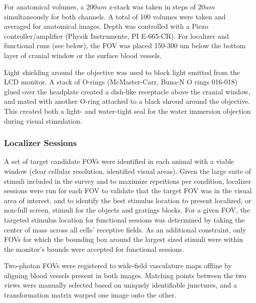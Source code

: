 For anatomical volumes, a 200$um$ z-stack was taken in steps of 20$um$ simultaneously for both channels. A total of 100 volumes were taken and averaged for anatomical images. Depth was controlled with a Piezo controller/amplifier (Physik Instrumente, PI E-665-CR). For localizer and functional runs (see below), the FOV was placed 150-300 um below the bottom layer of cranial window or the surface blood vessels. 

Light shielding around the objective was used to block light emitted from the LCD monitor. A stack of O-rings (McMaster-Carr, Buna-N O rings 016-018) glued over the headplate created a dish-like receptacle above the cranial window\cite{Goldey2014}, and mated with another O-ring attached to a black shroud around the objective. This created both a light- and water-tight seal for the water immersion objection during visual stimulation. 

\subsubsection{Localizer Sessions}
A set of target candidate FOVs were identified in each animal with a viable window (clear cellular resolution, identified visual areas). Given the large suite of stimuli included in the survey and to maximize repeitions per condition, localizer sessions were run for each FOV to validate that the target FOV was in the visual area of interest, and to identify the best stimulus location to present localized, or non-full screen, stimuli for the objects and gratings blocks. For a given FOV, the targeted stimulus location for functional sessions was determined by taking the center of mass across all cells' receptive fields. As an additional constraint, only FOVs for which the bounding box around the largest sized stimuli were within the monitor's bounds were accepted for functional sessions.

Two-photon FOVs were registered to wide-field vasculature maps offline by aligning blood vessels present in both images. Matching points between the two views were manually selected based on uniquely identifiable junctures, and a transformation matrix warped one image onto the other. 

